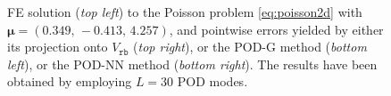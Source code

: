 \documentclass{elsarticle}
\numberwithin{equation}{section}
\theoremstyle{theorem}
\theoremstyle{definition}
\theoremstyle{remark}
\theoremstyle{proposition}
\numberwithin{figure}{section}
\newcommand{\bg}[1]{\boldsymbol{#1}}
\begin{document}
\begin{figure}[t!]
			
			
			\caption{FE solution (\emph{top left}) to the Poisson problem \eqref{eq:poisson2d} with $\bg{\mu} = (0.349, \, -0.413, \, 4.257)$, and pointwise errors yielded by either its projection onto $V_{\texttt{rb}}$ (\emph{top right}), or the POD-G method (\emph{bottom left}), or the POD-NN method (\emph{bottom right}). The results have been obtained by employing $L = 30$ POD modes.}
			\label{fig:poisson2d-fig2}
		\end{figure}	
		
\end{document}
